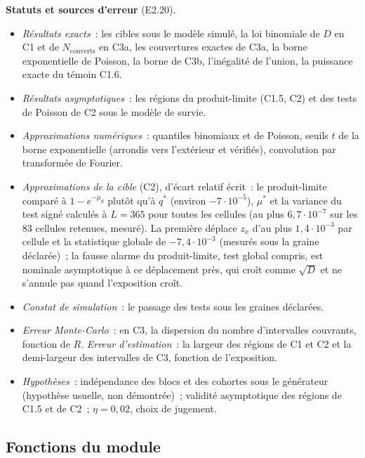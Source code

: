 \documentclass[a4paper,11pt]{article}
\begin{document}
\begin{encadre}
\small
\textbf{Statuts et sources d'erreur} (E2.20).
\begin{itemize}[leftmargin=*, itemsep=1pt, topsep=2pt]
  \item \emph{Résultats exacts}~: les cibles sous le modèle simulé, la loi
    binomiale de $D$ en C1 et de $N_{\text{couverts}}$ en C3a, les
    couvertures exactes de C3a, la borne exponentielle de Poisson, la borne
    de C3b, l'inégalité de l'union, la puissance exacte du témoin C1.6.
  \item \emph{Résultats asymptotiques}~: les régions du produit-limite (C1.5,
    C2) et des tests de Poisson de C2 sous le modèle de survie.
  \item \emph{Approximations numériques}~: quantiles binomiaux et de Poisson,
    seuils $t$ de la borne exponentielle (arrondis vers l'extérieur et
    vérifiés), convolution par transformée de Fourier.
  \item \emph{Approximations de la cible} (C2), d'écart relatif écrit~: le
    produit-limite comparé à $1 - e^{-\mu_d}$ plutôt qu'à $q^{*}$ (environ
    $-7 \cdot 10^{-5}$), $\mu^{*}$ et la variance du test signé calculés à
    $L = 365$ pour toutes les cellules (au plus $6{,}7 \cdot 10^{-7}$ sur les
    83 cellules retenues, mesuré). La première déplace $z_x$ d'au plus
    $1{,}4 \cdot 10^{-3}$ par cellule et la statistique globale de
    $-7{,}4 \cdot 10^{-3}$ (mesurés sous la graine déclarée)~; la fausse
    alarme du produit-limite, test global compris, est nominale
    asymptotique à ce déplacement près, qui croît comme $\sqrt{D}$ et ne
    s'annule pas quand l'exposition croît.
  \item \emph{Constat de simulation}~: le passage des tests sous les graines
    déclarées.
  \item \emph{Erreur Monte-Carlo}~: en C3, la dispersion du nombre
    d'intervalles couvrants, fonction de $R$. \emph{Erreur d'estimation}~: la
    largeur des régions de C1 et C2 et la demi-largeur des intervalles de
    C3, fonction de l'exposition.
  \item \emph{Hypothèses}~: indépendance des blocs et des cohortes sous le
    générateur (hypothèse usuelle, non démontrée)~; validité asymptotique des
    régions de C1.5 et de C2~; $\eta = 0{,}02$, choix de jugement.
\end{itemize}
\end{encadre}

\subsection{Fonctions du module}
\label{sec:fonctions-brut}
\end{document}
